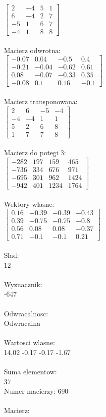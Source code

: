 \documentclass[a4paper,12pt]{article}
\begin{document}
$\begin{bmatrix} 2&-4&5&1\\6&-4&2&7\\-5&1&6&7\\-4&1&8&8 \end{bmatrix}$
\\
\\
Macierz odwrotna:\\

$\begin{bmatrix} -0.07&0.04&-0.5&0.4\\-0.21&-0.04&-0.62&0.61\\0.08&-0.07&-0.33&0.35\\-0.08&0.1&0.16&-0.1 \end{bmatrix}$
\\
\\
Macierz transponowana:\\

$\begin{bmatrix} 2&6&-5&-4\\-4&-4&1&1\\5&2&6&8\\1&7&7&8 \end{bmatrix}$
\\
\\
Macierz do potegi 3:\\

$\begin{bmatrix} -282&197&159&465\\-736&334&676&971\\-695&301&962&1424\\-942&401&1234&1764 \end{bmatrix}$
\\
\\
Wektory wlasne:\\

$\begin{bmatrix} 0.16&-0.39&-0.39&-0.43\\0.39&-0.75&-0.75&-0.8\\0.56&0.08&0.08&-0.37\\0.71&-0.1&-0.1&0.21 \end{bmatrix}$
\\
\\
Slad:\\
12
\\
\\
Wyznacznik:\\
-647
\\
\\
Odwracalnosc:\\
Odwracalna
\\
\\
Wartosci wlasne:\\
14.02 -0.17 -0.17 -1.67
\\
\\
Suma elementow:\\
37
\\
\newpage
Numer macierzy:
690
\\
\\
Macierz:\\
\end{document}
